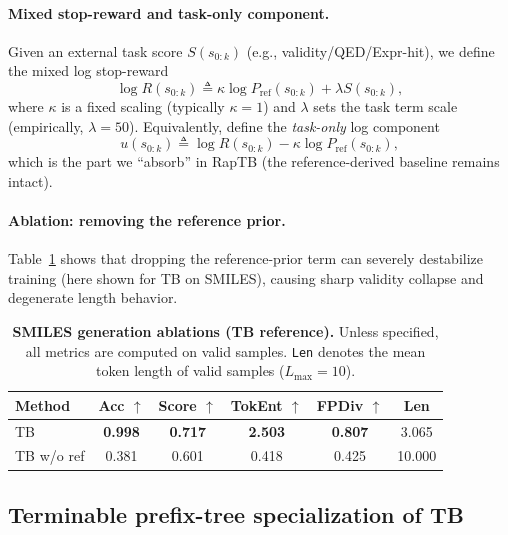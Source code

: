\documentclass{article}
\theoremstyle{plain}
\theoremstyle{definition}
\theoremstyle{remark}
\begin{document}
\paragraph{Mixed stop-reward and task-only component.}
Given an external task score $S(s_{0:k})$ (e.g., validity/QED/Expr-hit),
we define the mixed log stop-reward
\begin{equation}
\label{eq:app_mixed_reward}
\log R(s_{0:k}) \triangleq \kappa \log P_{\mathrm{ref}}(s_{0:k}) + \lambda S(s_{0:k}),
\end{equation}
where $\kappa$ is a fixed scaling (typically $\kappa{=}1$) and $\lambda$ sets the task term scale
(empirically, $\lambda=50$).
Equivalently, define the \emph{task-only} log component
\begin{equation}
\label{eq:app_task_only_u}
u(s_{0:k}) \triangleq \log R(s_{0:k}) - \kappa \log P_{\mathrm{ref}}(s_{0:k}),
\end{equation}
which is the part we ``absorb'' in RapTB (the reference-derived baseline remains intact).

\paragraph{Ablation: removing the reference prior.}
Table~\ref{tab:smiles_ablation_tb_ref} shows that dropping the reference-prior term can severely destabilize training (here shown for TB on SMILES), causing sharp validity collapse and degenerate length behavior.

\begin{table}[!htbp]
\centering
\small
\setlength{\tabcolsep}{4pt}
\renewcommand{\arraystretch}{1.08}
\caption{
\textbf{SMILES generation ablations (TB reference).}
Unless specified, all metrics are computed on valid samples.
\texttt{Len} denotes the mean token length of valid samples ($L_{\max}=10$).
}
\label{tab:smiles_ablation_tb_ref}
\vspace{-0.35em}
\begin{tabular}{@{}lccccc@{}}
\toprule
Method & Acc $\uparrow$ & Score $\uparrow$ & TokEnt $\uparrow$ & FPDiv $\uparrow$ & Len \\
\midrule
TB & \textbf{0.998} & \textbf{0.717} & \textbf{2.503} & \textbf{0.807} & 3.065 \\
TB w/o ref & 0.381 & 0.601 & 0.418 & 0.425 & 10.000 \\
\bottomrule
\end{tabular}
\end{table}

\subsection{Terminable prefix-tree specialization of TB}
\label{app:deriv_rooted}
\end{document}
